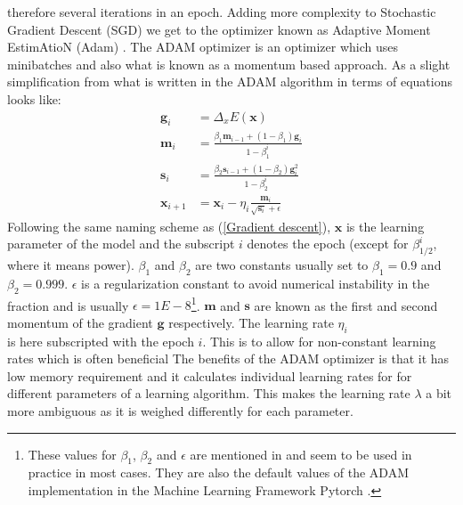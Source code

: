 therefore several iterations in an epoch.
Adding more complexity to Stochastic Gradient Descent (SGD) we get to the optimizer 
known as Adaptive Moment EstimAtioN (Adam) \citep{adam}. The ADAM optimizer is 
an optimizer which uses minibatches and also what is known as a momentum based approach.
As a slight simplification from what is written in \citet{fysstkweek40} the ADAM 
algorithm in terms of equations looks like:
\begin{align}
    \mathbf{g}_i &= \Delta_x E(\bm{x}) \label{ADAM.1} \\
    \bm{m}_i &= \frac{\beta_1 \bm{m}_{i-1} + (1 - \beta_1)\bm{g}_i}{1 - \beta_1^i} \\
    \bm{s}_i &= \frac{\beta_2 \bm{s}_{i-1} + (1-\beta_2)\bm{g}^2_i}{1 - \beta_2^i} \\
    \bm{x}_{i+1} &= \bm{x}_i - \eta_i \frac{\bm{m}_i}{\sqrt{\bm{s}_i}+ \epsilon} \label{ADAM.4}
\end{align}
Following the same naming scheme as (\ref{Gradient descent}), $\bm{x}$ is the 
learning parameter of the model and the subscript $i$ denotes the epoch (except 
for $\beta_{1/2}^i$, where it means power). 
$\beta_1$ and $\beta_2$ are two constants usually set to $\beta_1 = 0.9$ and 
$\beta_2 = 0.999$. $\epsilon$ is a regularization constant to avoid numerical 
instability in the fraction and is usually $\epsilon=1E-8$\footnote{These values 
for $\beta_1$, $\beta_2$ and $\epsilon$ are mentioned in \citet{adam} and seem 
to be used in practice in most cases. They are also the default values of the 
ADAM implementation in the Machine Learning Framework Pytorch \citep{NEURIPS2019_9015}.}.
$\bm{m}$ and $\bm{s}$ are known as the first and second momentum of the gradient 
$\bm{g}$ respectively. The learning rate $\eta_i$\\ is here subscripted with the 
epoch $i$. This is to allow for non-constant learning rates which is often beneficial 
The benefits of the ADAM optimizer is that it has low memory requirement and it calculates 
individual learning rates for for different parameters of a learning algorithm. 
This makes the learning rate $\lambda$ a bit more ambiguous as it is weighed 
differently for each parameter.
